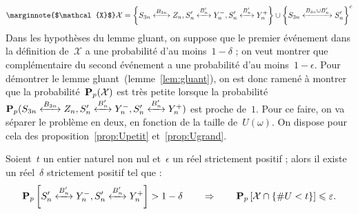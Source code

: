 			\[ 	\marginnote{$\mathcal{X}$}
				\mathcal{X} =
				\left\{
					\relie[B_{3n}]{S_{3n}}{Z_n},
					\relie[B_n']{S_n'}{Y_n^-},
					\relie[B_n']{S_n'}{Y_n^+}
				\right\}
				\cup
				\left\{
					\relie[B_{3n}\cup B_n']{S_{3n}}{S_n'}
				\right\}^c
			\]
			Dans les hypothèses du lemme gluant, on suppose que le premier événement dans la définition de~$\mathcal{X}$ a une probabilité d'au moins~$1-\delta$ ; on veut montrer que complémentaire du second événement a une probabilité d'au moins~$1-\epsilon$. Pour démontrer le lemme gluant~(lemme~\ref{lem:gluant}), on est donc ramené à montrer que la probabilité~$\bm{\mathrm{P}}_{p}(\mathcal{X})$ est très petite lorsque la probabilité~$\PpSP(\relie[B_{3n}]{S_{3n}}{Z_n}, \relie[B_n']{S_n'}{Y_n^-}, \relie[B_n']{S_n'}{Y_n^+})$ est proche de~$1$. Pour ce faire, on va séparer le problème en deux, en fonction de la taille de~$U(\omega)$. On dispose pour cela des proposition~\ref{prop:Upetit} et~\ref{prop:Ugrand}.
			\begin{prop}\label{prop:Upetit}
				Soient~$t$ un entier naturel non nul et~$\epsilon$ un réel strictement positif ; alors il existe un réel~$\delta$ strictement positif tel que :
				\[
					\Pp{\relie[B_n']{S_n'}{Y_n^-}, \relie[B_n']{S_n'}{Y_n^+}} > 1 - \delta
						\quad\quad
						\Rightarrow
						\quad\quad
					\Pp{\mathcal{X}\cap\{\#U<t\}} \leq \epsilon.
				\]
			\end{prop}
